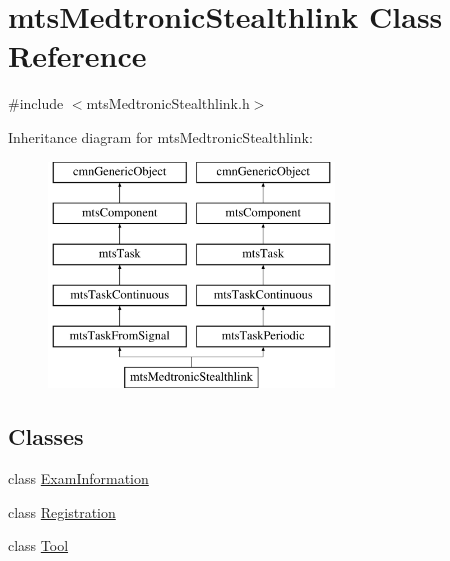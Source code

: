 \hypertarget{classmts_medtronic_stealthlink}{}\section{mts\+Medtronic\+Stealthlink Class Reference}
\label{classmts_medtronic_stealthlink}


{\ttfamily \#include $<$mts\+Medtronic\+Stealthlink.\+h$>$}

Inheritance diagram for mts\+Medtronic\+Stealthlink\+:\begin{figure}[H]
\begin{center}
\leavevmode
\includegraphics[height=6.000000cm]{dc/d49/classmts_medtronic_stealthlink}
\end{center}
\end{figure}
\subsection*{Classes}
\begin{DoxyCompactItemize}
\item 
class \hyperlink{classmts_medtronic_stealthlink_1_1_exam_information}{Exam\+Information}
\item 
class \hyperlink{classmts_medtronic_stealthlink_1_1_registration}{Registration}
\item 
class \hyperlink{classmts_medtronic_stealthlink_1_1_tool}{Tool}
\end{DoxyCompactItemize}

